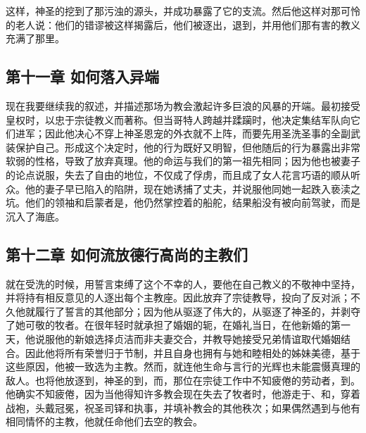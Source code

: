这样，神圣的挖到了那污浊的源头，并成功暴露了它的支流。然后他这样对那可怜的老人说：他们的错谬被这样揭露后，他们被逐出，退到，并用他们那有害的教义充满了那里。\par


\subsection{第十一章 如何落入异端}

现在我要继续我的叙述，并描述那场为教会激起许多巨浪的风暴的开端。最初接受皇权时，以忠于宗徒教义而著称。但当哥特人跨越并蹂躏时，他决定集结军队向它们进军；因此他决心不穿上神圣恩宠的外衣就不上阵，而要先用圣洗圣事的全副武装保护自己。形成这个决定时，他的行为既好又明智，但他随后的行为暴露出非常软弱的性格，导致了放弃真理。他的命运与我们的第一祖先相同；因为他也被妻子的论点说服，失去了自由的地位，不仅成了俘虏，而且成了女人花言巧语的顺从听众。他的妻子早已陷入的陷阱，现在她诱捕了丈夫，并说服他同她一起跌入亵渎之坑。他们的领袖和启蒙者是，他仍然掌控着的船舵，结果船没有被向前驾驶，而是沉入了海底。\par


\subsection{第十二章 如何流放德行高尚的主教们}

就在受洗的时候，用誓言束缚了这个不幸的人，要他在自己教义的不敬神中坚持，并将持有相反意见的人逐出每个主教座。因此放弃了宗徒教导，投向了反对派；不久他就履行了誓言的其他部分；因为他从驱逐了伟大的，从驱逐了神圣的，并剥夺了她可敬的牧者。在很年轻时就承担了婚姻的轭，在婚礼当日，在他新婚的第一天，他说服他的新娘选择贞洁而非夫妻交合，并教导她接受兄弟情谊取代婚姻结合。因此他将所有荣誉归于节制，并且自身也拥有与她和睦相处的姊妹美德，基于这些原因，他被一致选为主教。然而，就连他生命与言行的光辉也未能震慑真理的敌人。也将他放逐到，神圣的到，而，那位在宗徒工作中不知疲倦的劳动者，到。他确实不知疲倦，因为当他得知许多教会现在失去了牧者时，他游走于、和，穿着战袍，头戴冠冕，祝圣司铎和执事，并填补教会的其他秩次；如果偶然遇到与他有相同情怀的主教，他就任命他们去空的教会。\par

